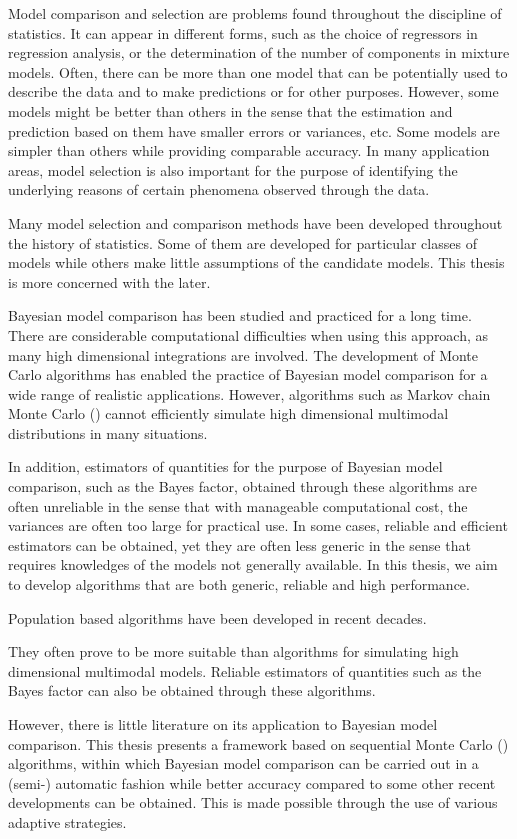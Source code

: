 Model comparison and selection are problems found throughout the discipline of statistics. It can appear in different forms, such as the choice of regressors in regression analysis, or the determination of the number of components in mixture models. Often, there can be more than one model that can be potentially used to describe the data and to make predictions or for other purposes. However, some models might be better than others in the sense that the estimation and prediction based on them have smaller errors or variances, etc. Some models are simpler than others while providing comparable accuracy. In many application areas, model selection is also important for the purpose of identifying the underlying reasons of certain phenomena observed through the data.
\begin{draftpar}
Many model selection and comparison methods have been developed throughout the history of statistics. Some of them are developed for particular classes of models while others make little assumptions of the candidate models. This thesis is more concerned with the later.
\end{draftpar}

Bayesian model comparison has been studied and practiced for a long time. There are considerable computational difficulties when using this approach, as many high dimensional integrations are involved. The development of Monte Carlo algorithms has enabled the practice of Bayesian model comparison for a wide range of realistic applications. However, algorithms such as Markov chain Monte Carlo (\mcmc) cannot efficiently simulate high dimensional multimodal distributions in many situations.
\begin{draftpar}
In addition, estimators of quantities for the purpose of Bayesian model comparison, such as the Bayes factor, obtained through these algorithms are often unreliable in the sense that with manageable computational cost, the variances are often too large for practical use. In some cases, reliable and efficient estimators can be obtained, yet they are often less generic in the sense that requires knowledges of the models not generally available. In this thesis, we aim to develop algorithms that are both generic, reliable and high performance.
\end{draftpar}

Population based algorithms have been developed in recent decades.
\begin{draftpar}
They often prove to be more suitable than \mcmc algorithms for simulating high dimensional multimodal models. Reliable estimators of quantities such as the Bayes factor can also be obtained through these algorithms.
\end{draftpar}
However, there is little literature on its application to Bayesian model comparison. This thesis presents a framework based on sequential Monte Carlo (\smc) algorithms, within which Bayesian model comparison can be carried out in a (semi-) automatic fashion while better accuracy compared to some other recent developments can be obtained. This is made possible through the use of various adaptive strategies.

